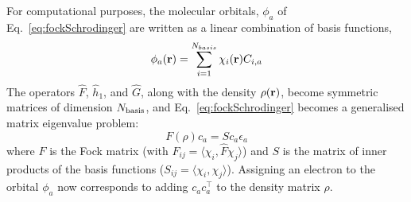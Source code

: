 \documentclass[twoside,11pt]{article}
\begin{document}
For computational purposes, the molecular orbitals, $\phi_a$ of Eq.~\ref{eq:fockSchrodinger} are written as a linear combination of basis functions,
\begin{equation}\label{eq:lcao}
\phi_a({\bf r}) = \sum_{i=1}^{N_{basis}} \chi_i({\bf r}) C_{i,a}
\end{equation}
The operators $\hat{F}$, $\hat{h}_1$, and $\hat{G}$, along with the density $\rho({\bf r})$, become symmetric matrices of dimension $N_{\rm basis}$, and Eq.~\ref{eq:fockSchrodinger} becomes a generalised matrix eigenvalue problem:
\begin{equation}\label{eq:fockMatrix}
F(\rho)c_a = Sc_a\epsilon_a
\end{equation}
where $F$ is the Fock matrix (with $F_{ij} = \langle \chi_i, \hat F\chi_j\rangle$) and $S$ is the matrix of inner products of the basis functions ($S_{ij} = \langle\chi_i,\chi_j\rangle$).  Assigning an electron to the orbital $\phi_a$ now corresponds to adding $c_a c_a^\top$ to the density matrix $\rho$.




\end{document}
